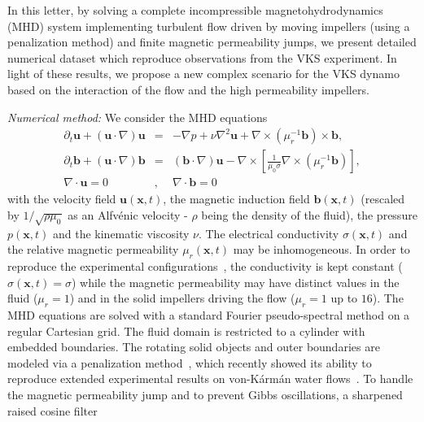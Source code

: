 \documentclass[aps,prl,twocolumn,showpacs,amsmath,amssymb]{revtex4-1}%
\begin{document}
In this letter, by solving a complete incompressible magnetohydrodynamics (MHD) system implementing turbulent flow driven by moving impellers (using a penalization method) and finite magnetic permeability jumps, we present detailed numerical dataset which reproduce observations from the VKS experiment. In light of these results, we propose a new complex scenario for the VKS dynamo  based on the interaction of the flow and the high permeability impellers.

\vspace{.2 cm}

\textit{Numerical method: }\label{sec:num}
We consider the MHD equations
\begin{eqnarray}
\partial_t{\mathbf{u}} + (\mathbf{u} \cdot \nabla) \mathbf{u} &=& - \nabla p + \nu \nabla^2 \mathbf{u} + \nabla \times ( \mu_r^{-1} \mathbf{b} ) \times \mathbf{b},\label{NSeq}\\
\partial_t{\mathbf{b}} + (\mathbf{u} \cdot \nabla) \mathbf{b} &=& (\mathbf{b} \cdot \nabla) \mathbf{u} - \nabla \times \left[ \frac{1}{\mu_0 \sigma} \nabla \times ( \mu_r^{-1} \mathbf{b} ) \right],\label{Indeq}\\
\nabla \cdot \mathbf{u}  = 0&,&
\nabla \cdot \mathbf{b}  = 0\label{Incompeq}
\end{eqnarray}
with the velocity field $\mathbf{u}(\mathbf{x},t)$, the magnetic induction field 
$\mathbf{b}(\mathbf{x},t)$ (rescaled by $1/\sqrt{\rho \mu_0}$ as an Alfv\'enic velocity - $\rho$ being the density of the fluid), the pressure $p(\mathbf{x},t)$ and the kinematic viscosity $\nu$. 
The electrical conductivity $\sigma(\mathbf{x},t)$  and the relative magnetic permeability $\mu_r(\mathbf{x},t)$ may be inhomogeneous. In order to reproduce the experimental configurations~\cite{paper:miralles:2013}, 
the conductivity is kept constant ($\sigma(\mathbf{x},t) =\sigma$) while the magnetic permeability may have distinct values in the fluid ($\mu_r=1$) and in the solid impellers driving the flow ($\mu_r=1$ up to $16$).
The MHD equations are solved with a standard Fourier pseudo-spectral method on a regular Cartesian grid.
The fluid domain is restricted to a cylinder with embedded boundaries. The rotating solid objects and outer boundaries are modeled via a penalization method~\cite{paper:fadlun:2000}, which recently showed its ability to reproduce extended experimental results on von-K\'arm\'an water flows~\cite{paper:kreuzahler:2014}.  
To handle the magnetic permeability jump and to prevent Gibbs oscillations, a sharpened raised cosine filter~\cite{script:canuto:1991} 
\end{document}
